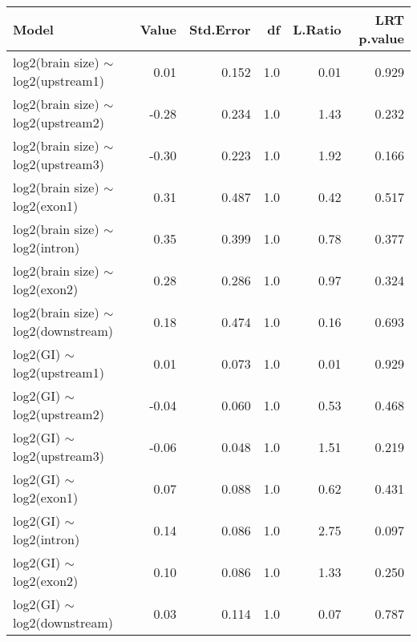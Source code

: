 \begin{table}[ht]
\centering
\begin{tabular}{lrrrrr}
  \hline
Model & Value & Std.Error & df & L.Ratio & LRT p.value \\ 
  \hline
log2(brain size) $\sim$ log2(upstream1) & 0.01 & 0.152 & 1.0 & 0.01 & 0.929 \\ 
  log2(brain size) $\sim$ log2(upstream2) & -0.28 & 0.234 & 1.0 & 1.43 & 0.232 \\ 
  log2(brain size) $\sim$ log2(upstream3) & -0.30 & 0.223 & 1.0 & 1.92 & 0.166 \\ 
  log2(brain size) $\sim$ log2(exon1) & 0.31 & 0.487 & 1.0 & 0.42 & 0.517 \\ 
  log2(brain size) $\sim$ log2(intron) & 0.35 & 0.399 & 1.0 & 0.78 & 0.377 \\ 
  log2(brain size) $\sim$ log2(exon2) & 0.28 & 0.286 & 1.0 & 0.97 & 0.324 \\ 
  log2(brain size) $\sim$ log2(downstream) & 0.18 & 0.474 & 1.0 & 0.16 & 0.693 \\ 
   \hline
log2(GI) $\sim$ log2(upstream1) & 0.01 & 0.073 & 1.0 & 0.01 & 0.929 \\ 
  log2(GI) $\sim$ log2(upstream2) & -0.04 & 0.060 & 1.0 & 0.53 & 0.468 \\ 
  log2(GI) $\sim$ log2(upstream3) & -0.06 & 0.048 & 1.0 & 1.51 & 0.219 \\ 
  log2(GI) $\sim$ log2(exon1) & 0.07 & 0.088 & 1.0 & 0.62 & 0.431 \\ 
  log2(GI) $\sim$ log2(intron) & 0.14 & 0.086 & 1.0 & 2.75 & 0.097 \\ 
  log2(GI) $\sim$ log2(exon2) & 0.10 & 0.086 & 1.0 & 1.33 & 0.250 \\ 
  log2(GI) $\sim$ log2(downstream) & 0.03 & 0.114 & 1.0 & 0.07 & 0.787 \\ 
  \hline
  \end{tabular}
\end{table}
